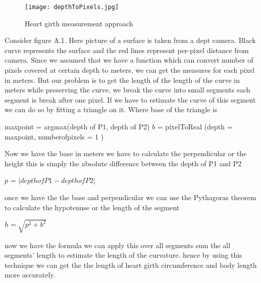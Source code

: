\begin{figure}[h]
\centering
\texttt{[image: depthToPixels.jpg]}
\caption{Heart girth measurement approach}
\end{figure}

Consider figure A.1. Here picture of a surface is taken from a dept camera. Black curve represents the surface and the red lines represent per-pixel distance from camera. Since we assumed that we have a function which can convert number of pixels covered at certain depth to meters, we can get the measures for each pixel in meters. But our problem is to get the length of the length of the curve in meters while preserving the curve, we break the curve into small segments each segment is break after one pixel. If we have to estimate the curve of this segment we can do  so by fitting a triangle on it.  Where base of the triangle is \\ 
\begin{center}
 maxpoint = argmax(depth of P1, depth of P2)  
$b$ = pixelToReal (depth = maxpoint, numberofpixels = 1 ) 
 
\end{center}
Now we have the base in meters we have to calculate the perpendicular or the height this is simply the absolute difference between the depth of P1 and P2 
\begin{center}
 $p$ = \(|depth of P1 -  depth of P2|\) 

\end{center}

once we have the the base and perpendicular we can use the Pythagoras theorem to calculate the hypotenuse or the length of the segment  
\begin{center}

$h=\sqrt{ p^2 + b^2}$ 

\end{center}
						
now we have the formula we can apply this over all segments sum the all segments' length to estimate the length of the curvature. hence by using this technique we can get the the length of heart girth circumference and body length more accurately.
